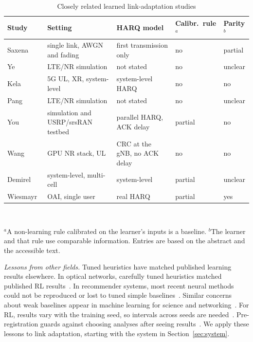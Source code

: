 \begin{table}[t]
\caption{Closely related learned link-adaptation studies}\label{tab:lit}
\centering\footnotesize
\setlength{\tabcolsep}{3pt}
\begin{tabular}{@{}p{1.55cm}p{2.5cm}p{1.8cm}p{0.9cm}p{0.8cm}@{}}
\toprule
Study & Setting & HARQ model & Calibr.\ rule$^a$ & Parity$^b$\\
\midrule
Saxena~\cite{saxena2022tuningfree} & single link, AWGN and fading & first transmission only & no & partial\\
Ye~\cite{ye2023drlla} & LTE/NR simulation & not stated & no & unclear\\
Kela~\cite{kela2022delayolla} & 5G UL, XR, system-level & system-level HARQ & no & no\\
Pang~\cite{pang2024td3olla} & LTE/NR simulation & not stated & no & unclear\\
You~\cite{you2026sim2real} & simulation and USRP/srsRAN testbed & parallel HARQ, ACK delay & partial & no\\
Wang~\cite{wang2026lolla} & GPU NR stack, UL & CRC at the gNB, no ACK delay & no & no\\
Demirel~\cite{demirel2025genrl} & system-level, multi-cell & system-level & partial & unclear\\
Wiesmayr~\cite{wiesmayr2025salad} & OAI, single user & real HARQ & partial & yes\\
\bottomrule
\end{tabular}\\[2pt]
\parbox{\columnwidth}{\scriptsize $^a$A non-learning rule calibrated on the learner's inputs is a baseline. $^b$The learner and that rule use comparable information. Entries are based on the abstract and the accessible text.}
\end{table}

\emph{Lessons from other fields.} Tuned heuristics have matched published learning results elsewhere. In optical networks, carefully tuned heuristics matched published RL results~\cite{doherty2025hypehope}. In recommender systems, most recent neural methods could not be reproduced or lost to tuned simple baselines~\cite{ferraridacrema2019progress}. Similar concerns about weak baselines appear in machine learning for science and networking~\cite{mcgreivy2024weak,kapoor2023leakage,mangal2026gengap}. For RL, results vary with the training seed, so intervals across seeds are needed~\cite{henderson2018matters,colas2018seeds,agarwal2021precipice}. Pre-registration guards against choosing analyses after seeing results~\cite{nosek2018prereg,albanie2022preregml}. We apply these lessons to link adaptation, starting with the system in Section~\ref{sec:system}.
